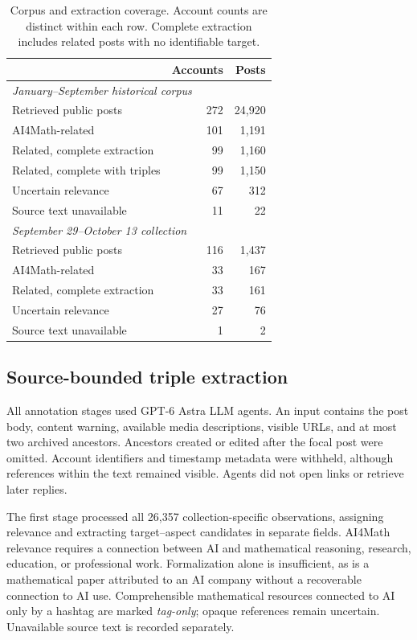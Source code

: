 \documentclass[sigconf,balance=false]{acmart}
\begin{document}
\begin{table}[tp]
\caption{Corpus and extraction coverage. Account counts are distinct within each row. Complete extraction includes related posts with no identifiable target.}
\label{tab:flow}
\centering
\begin{tabular}{lrr}
\toprule & Accounts & Posts\\
\midrule
\multicolumn{3}{l}{\emph{January--September historical corpus}}\\
Retrieved public posts & 272 & 24,920\\
AI4Math-related & 101 & 1,191\\
Related, complete extraction & 99 & 1,160\\
Related, complete with triples & 99 & 1,150\\
Uncertain relevance & 67 & 312\\
Source text unavailable & 11 & 22\\
\midrule
\multicolumn{3}{l}{\emph{September 29--October 13 collection}}\\
Retrieved public posts & 116 & 1,437\\
AI4Math-related & 33 & 167\\
Related, complete extraction & 33 & 161\\
Uncertain relevance & 27 & 76\\
Source text unavailable & 1 & 2\\
\bottomrule
\end{tabular}
\end{table}

\subsection{Source-bounded triple extraction}\label{sec:extraction}
All annotation stages used GPT-6 Astra LLM agents. An input contains the post body, content warning, available media descriptions, visible URLs, and at most two archived ancestors. Ancestors created or edited after the focal post were omitted. Account identifiers and timestamp metadata were withheld, although references within the text remained visible. Agents did not open links or retrieve later replies.

The first stage processed all 26,357 collection-specific observations, assigning relevance and extracting target--aspect candidates in separate fields. AI4Math relevance requires a connection between AI and mathematical reasoning, research, education, or professional work. Formalization alone is insufficient, as is a mathematical paper attributed to an AI company without a recoverable connection to AI use. Comprehensible mathematical resources connected to AI only by a hashtag are marked \emph{tag-only}; opaque references remain uncertain. Unavailable source text is recorded separately.
\end{document}
